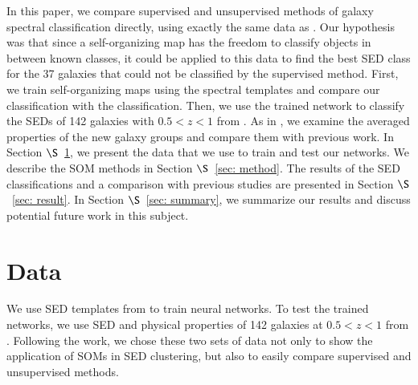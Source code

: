 In this paper, we compare supervised and unsupervised methods of galaxy spectral classification directly, using exactly the same data as .  
Our hypothesis was that since a self-organizing map has the freedom to classify objects in between known classes, it could be applied to this data 
to find the best SED class for the 37 galaxies that could not be classified by the supervised method.
First, we train self-organizing maps using the  spectral templates and compare our classification with the  classification.
Then, we use the trained network to classify the SEDs of 142 galaxies with $0.5 < z < 1$ from . 
As in , we examine the averaged properties of the new galaxy groups and compare them with previous work.
In Section $\S$~\ref{sec: data_highZ}, we present the data that we use to train and test our networks. 
We describe the SOM methods in Section $\S$~\ref{sec: method}. 
The results of the SED classifications and a comparison with previous studies are presented in Section $\S$~\ref{sec: result}. 
In Section $\S$~\ref{sec: summary}, we summarize our results and discuss potential future work in this subject.

\section{Data}
\label{sec: data_highZ}
We use SED templates from  to train neural networks.
To test the trained networks, we use SED and physical properties of 142 galaxies at $0.5<z<1$ from .
Following the  work, we chose these two sets of data not only to show the application of SOMs in SED clustering, but also to easily compare supervised and unsupervised methods.

